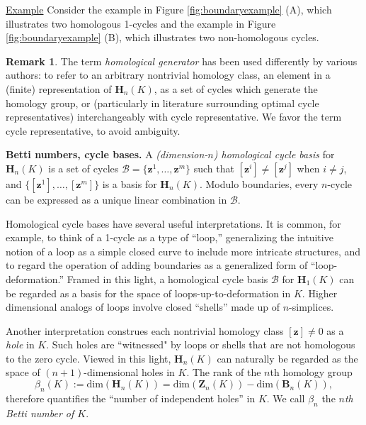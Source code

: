 \documentclass[11pt,onecolumn]{article}
\newcommand{\Homologies}[0]{\mathbf{H}}
\newcommand{\Boundaries}[0]{\mathbf{B}}
\newcommand{\Cycles}[0]{\mathbf{Z}}
\newcommand{\cycle}{{\mathbf z}}
\newcommand{\hcyclebasis}{\mathcal B}
\theoremstyle{plain}
\theoremstyle{definition}
\newtheorem{remark}[theorem]{Remark}
\begin{document}
\noindent \underline{Example} Consider the example in Figure \ref{fig:boundaryexample} (A), which illustrates two homologous 1-cycles and the example in Figure \ref{fig:boundaryexample} (B), which illustrates two non-homologous cycles. 



\begin{remark}
The term \emph{homological generator} has been used differently by various authors: to refer to an arbitrary nontrivial homology class, an element in a (finite) representation of $\Homologies_n(K)$, as a set of cycles which generate the homology group, or (particularly in literature surrounding optimal cycle representatives)  interchangeably with cycle representative. We favor the term cycle representative, to avoid ambiguity.
\end{remark}




\noindent \textbf{Betti numbers, cycle bases.}  A \emph{(dimension-$n$) homological cycle basis} for $\Homologies_n(K)$ is a set of cycles $\hcyclebasis = \{ \cycle^1 , \ldots, \cycle^m\}$ such that $[\cycle^i] \neq [\cycle^j]$ when $i \neq j$, and $\{ [\cycle^1] , \ldots, [\cycle^m]\}$ is a  basis for $\Homologies_n(K)$.  Modulo boundaries, every $n$-cycle can be expressed as a unique linear combination in $\hcyclebasis$.  

Homological cycle bases have several useful interpretations.  It is common, for example, to think of a 1-cycle as a type of ``loop,'' generalizing the intuitive notion of a loop as a simple closed curve to include more intricate structures, and to regard the operation of adding boundaries as a generalized form of ``loop-deformation.''  Framed in this light, a homological cycle basis $\hcyclebasis$ for $\Homologies_1(K)$ can be regarded as a basis for the space of loops-up-to-deformation in $K$. Higher dimensional analogs of loops involve closed ``shells'' made up of $n$-simplices.

Another interpretation construes each nontrivial homology class $[\cycle] \neq 0$ as a \emph{hole} in $K$. Such holes are ``witnessed" by loops or shells that are not homologous to the zero cycle. Viewed in this light, $\Homologies_n(K)$ can naturally be regarded as the space of $(n+1)$-dimensional holes in $K$.  The rank of the $n$th homology group
    \[
    \beta_n(K) := \text{dim}(\Homologies_n(K)) = \text{dim}(\Cycles_n(K)) - \text{dim}(\Boundaries_n(K)),
    \]
therefore quantifies the ``number of independent holes'' in $K$.  We call $\beta_n$ the \emph{$n$th Betti number of $K$}.  
 
\end{document}
